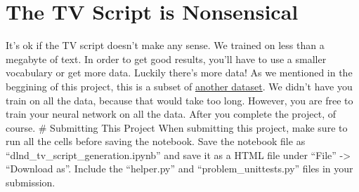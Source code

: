 \documentclass[11pt]{article}
\begin{document}
    \hypertarget{the-tv-script-is-nonsensical}{%
\section{The TV Script is
Nonsensical}\label{the-tv-script-is-nonsensical}}

It's ok if the TV script doesn't make any sense. We trained on less than
a megabyte of text. In order to get good results, you'll have to use a
smaller vocabulary or get more data. Luckily there's more data! As we
mentioned in the beggining of this project, this is a subset of
\href{https://www.kaggle.com/wcukierski/the-simpsons-by-the-data}{another
dataset}. We didn't have you train on all the data, because that would
take too long. However, you are free to train your neural network on all
the data. After you complete the project, of course. \# Submitting This
Project When submitting this project, make sure to run all the cells
before saving the notebook. Save the notebook file as
``dlnd\_tv\_script\_generation.ipynb'' and save it as a HTML file under
``File'' -\textgreater{} ``Download as''. Include the ``helper.py'' and
``problem\_unittests.py'' files in your submission.


    
    
    
    
\end{document}
